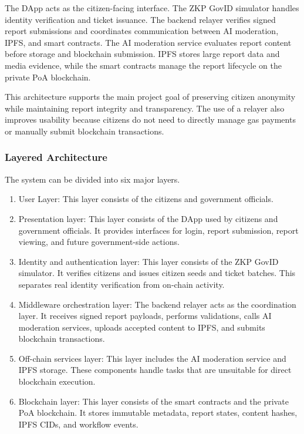 The DApp acts as the citizen-facing interface. The ZKP GovID simulator handles identity verification and ticket issuance. The backend relayer verifies signed report submissions and coordinates communication between AI moderation, IPFS, and smart contracts. The AI moderation service evaluates report content before storage and blockchain submission. IPFS stores large report data and media evidence, while the smart contracts manage the report lifecycle on the private PoA blockchain.

This architecture supports the main project goal of preserving citizen anonymity while maintaining report integrity and transparency. The use of a relayer also improves usability because citizens do not need to directly manage gas payments or manually submit blockchain transactions.

\subsubsection{Layered Architecture}

The system can be divided into six major layers.

\begin{enumerate}
    \item User Layer: This layer consists of the citizens and government officials. 
    \item  Presentation layer:
This layer consists of the DApp used by citizens and government officials. It provides interfaces for login, report submission, report viewing, and future government-side actions.
    \item Identity and authentication layer:
This layer consists of the ZKP GovID simulator. It verifies citizens and issues citizen seeds and ticket batches. This separates real identity verification from on-chain activity.
    \item Middleware orchestration layer:
The backend relayer acts as the coordination layer. It receives signed report payloads, performs validations, calls AI moderation services, uploads accepted content to IPFS, and submits blockchain transactions.
    \item Off-chain services layer:
This layer includes the AI moderation service and IPFS storage. These components handle tasks that are unsuitable for direct blockchain execution.
    \item Blockchain layer:
This layer consists of the smart contracts and the private PoA blockchain. It stores immutable metadata, report states, content hashes, IPFS CIDs, and workflow events.

\end{enumerate}


